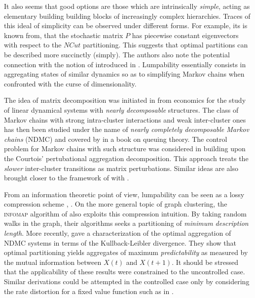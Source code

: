 It also seems that good options are those which are intrinsically \textit{simple}, acting as
elementary building building blocks of increasingly complex hierarchies. Traces of this
ideal of simplicity can be observed under different forms. For example, its is
known from\cite{Shi2001}, that the stochastic matrix $P$ has piecewise constant
eigenvectors with respect to the $NCut$ partitioning. This suggests that optimal
partitions can be described more succinctly (simply). The authors also note the
potential connection with the notion of  introduced in
\cite{Kemeny1976}. Lumpability essentially consists in aggregating states of similar
dynamics so as to simplifying Markov chains when confronted with the curse of
dimensionality. 

The idea of matrix decomposition was initiated in \cite{AndoFisher1963} from
economics for the study of linear dynamical systems with \textit{nearly decomposable}
structures. The class of Markov chains with strong intra-cluster interactions and weak
inter-cluster ones has then been studied under the name of \textit{nearly completely
decomposable Markov chains} (NDMC) \cite{Gaitsgori1975} and covered by
\cite{Courtois1977} in a book on queuing theory. The control problem for Markov chains
with such structure was considered in \cite{Teneketzis1980, Delebecque1981,
Phillips1981, Coderch1983} building upon the Courtois' pertubational aggregation
decomposition. This approach treats the \textit{slower} inter-cluster transitions as
matrix perturbations. Similar ideas are also brought closer to the framework of \mdps
with \cite{Haviv1985, Aldhaheri1991, Zhang1997}. 

From an information theoretic point of view, lumpability can be seen as a lossy
compression scheme \cite{Lindqvist1978}, \cite{Watanabe1960}. On the more general
topic of graph clustering, the  \textsc{infomap} algorithm of \cite{Rosvall2008} also
exploits this compression intuition. By taking random walks in the graph, their
algorithms seeks a partitioning of \textit{minimum description length}. More recently,
\cite{Deng2011} gave a characterization of the optimal aggregation of NDMC systems in
terms of the Kullback-Leibler divergence. They show that optimal partitioning yields
aggregates of maximum \textit{predictability} as measured by the mutual information
between $X(t)$ and $X(t+1)$. It should be stressed that the applicability of these results
were constrained to the uncontrolled case. Similar derivations could be attempted in the
controlled case only by considering the rate distortion for a fixed value function such as
in \cite{Still2012}.
